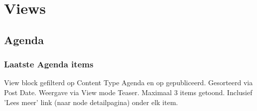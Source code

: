 \section{Views}\label{views}

\subsection{Agenda}
\subsubsection{Laatste Agenda items}\label{laatste-agenda-items}
View block gefilterd op Content Type Agenda en op gepubliceerd. Gesorteerd via Post Date. Weergave via View mode Teaser. Maximaal 3 items getoond. Inclusief 'Lees meer' link (naar node detailpagina) onder elk item.